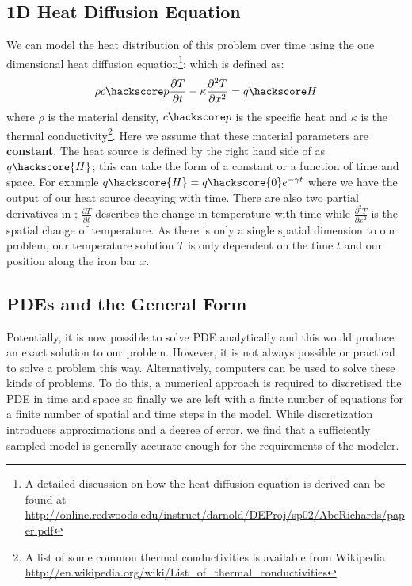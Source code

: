 \subsection{1D Heat Diffusion Equation}
We can model the heat distribution of this problem over time using the one dimensional heat diffusion equation\footnote{A detailed discussion on how the heat diffusion equation is derived can be found at \url{http://online.redwoods.edu/instruct/darnold/DEProj/sp02/AbeRichards/paper.pdf}};
which is defined as:
\begin{equation}
\rho c\hackscore p \frac{\partial T}{\partial t} - \kappa \frac{\partial^{2} T}{\partial x^{2}} = q\hackscore H 
\label{eqn:hd}
\end{equation}
where $\rho$ is the material density, $c\hackscore p$ is the specific heat and $\kappa$ is the thermal 
conductivity\footnote{A list of some common thermal conductivities is available from Wikipedia \url{http://en.wikipedia.org/wiki/List_of_thermal_conductivities}}. Here we assume that these material 
parameters are \textbf{constant}. 
The heat source is defined by the right hand side of  as $q\hackscore{H}$; this can take the form of a constant or a function of time and space. For example $q\hackscore{H} = q\hackscore{0}e^{-\gamma t}$ where we have the output of our heat source decaying with time. There are also two partial derivatives in ; $\frac{\partial T}{\partial t}$ describes the change in temperature with time while $\frac{\partial ^2 T}{\partial x^2}$ is the spatial change of temperature. As there is only a single spatial dimension to our problem, our temperature solution $T$ is only dependent on the time $t$ and our position along the iron bar $x$.

\subsection{PDEs and the General Form}
Potentially, it is now possible to solve PDE  analytically and this would produce an exact solution to our problem. However, it is not always possible or practical to solve a problem this way. Alternatively, computers can be used to solve these kinds of problems. To do this, a numerical approach is required to discretised 
the PDE  in time and space so finally we are left with a finite number of equations for a finite number of spatial and time steps in the model. While discretization introduces approximations and a degree of error, we find that a sufficiently sampled model is generally accurate enough for the requirements of the modeler.

